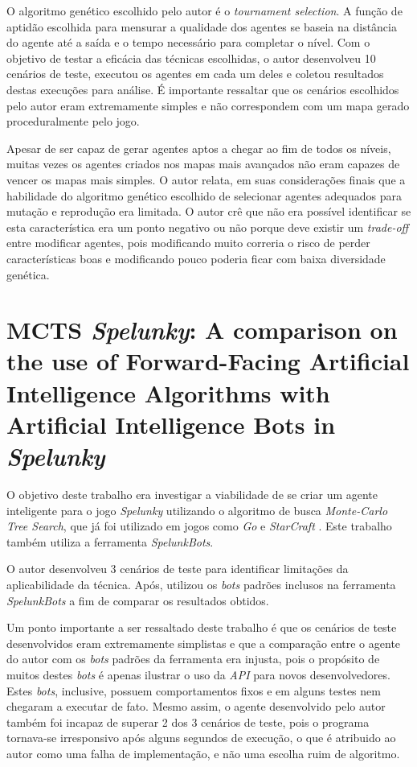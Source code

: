 O algoritmo genético escolhido pelo autor é o \textit{tournament selection}. A
função de aptidão escolhida para mensurar a qualidade dos agentes se baseia na
distância do agente até a saída e o tempo necessário para completar o nível. Com
o objetivo de testar a eficácia das técnicas escolhidas, o autor desenvolveu 10
cenários de teste, executou os agentes em cada um deles e coletou resultados
destas execuções para análise. É importante ressaltar que os cenários escolhidos
pelo autor eram extremamente simples e não correspondem com um mapa gerado
proceduralmente pelo jogo.

Apesar de ser capaz de gerar agentes aptos a chegar ao fim de todos os níveis,
muitas vezes os agentes criados nos mapas mais avançados não eram capazes de
vencer os mapas mais simples. O autor relata, em suas considerações finais que a
habilidade do algoritmo genético escolhido de selecionar agentes adequados para
mutação e reprodução era limitada. O autor crê que não era possível identificar
se esta característica era um ponto negativo ou não porque deve existir um
\textit{trade-off} entre modificar agentes, pois modificando muito correria o
risco de perder características boas e modificando pouco poderia ficar com baixa
diversidade genética. 


\section{MCTS \textit{Spelunky}: A comparison on the use of Forward-Facing
Artificial Intelligence Algorithms with Artificial Intelligence Bots in
\textit{Spelunky}}
O objetivo deste trabalho era investigar a viabilidade de se criar um agente
inteligente para o jogo \textit{Spelunky} utilizando o algoritmo de busca
\textit{Monte-Carlo Tree Search}, que já foi utilizado em jogos como \textit{Go}
e \textit{StarCraft} \cite{spelunky_mcts}. Este trabalho também utiliza a
ferramenta \textit{SpelunkBots}.

O autor desenvolveu 3 cenários de teste para identificar limitações da
aplicabilidade da técnica. Após, utilizou os \textit{bots} padrões inclusos na
ferramenta \textit{SpelunkBots} a fim de comparar os resultados obtidos. 

Um ponto importante a ser ressaltado deste trabalho é que os cenários de teste
desenvolvidos eram extremamente simplistas e que a comparação entre o agente do
autor com os \textit{bots} padrões da ferramenta era injusta, pois o propósito
de muitos destes \textit{bots} é apenas ilustrar o uso da \textit{API} para
novos desenvolvedores. Estes \textit{bots}, inclusive, possuem comportamentos
fixos e em alguns testes nem chegaram a executar de fato. Mesmo assim, o agente
desenvolvido pelo autor também foi incapaz de superar 2 dos 3 cenários de teste,
pois o programa tornava-se irresponsivo após alguns segundos de execução, o que
é atribuido ao autor como uma falha de implementação, e não uma escolha ruim de
algoritmo.


